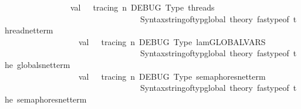 \begin{isabellebody}
\ \ \ \ \ \ \ \ \ \ \ \ \ {\isacharparenleft}{\kern0pt}{\isacharasterisk}{\kern0pt}\ \ \ val\ {\isacharunderscore}{\kern0pt}\ {\isacharequal}{\kern0pt}\ tracing\ {\isacharparenleft}{\kern0pt}{\isachardoublequote}{\kern0pt}{\isacharbackslash}{\kern0pt}n\ {\isacharbrackleft}{\kern0pt}DEBUG{\isacharbrackright}{\kern0pt}\ Type\ threads\ {\isacharequal}{\kern0pt}\ {\isachardoublequote}{\kern0pt}\ {\isacharcircum}{\kern0pt}\isanewline
\ \ \ \ \ \ \ \ \ \ \ \ \ \ \ \ \ \ \ \ \ \ \ \ \ \ \ \ \ \ \ \ \ Syntax{\isachardot}{\kern0pt}string{\isacharunderscore}{\kern0pt}of{\isacharunderscore}{\kern0pt}typ{\isacharunderscore}{\kern0pt}global\ {\isacharat}{\kern0pt}{\isacharbraceleft}{\kern0pt}theory{\isacharbraceright}{\kern0pt}\ {\isacharparenleft}{\kern0pt}fastype{\isacharunderscore}{\kern0pt}of\ {\isacharparenleft}{\kern0pt}thread{\isacharunderscore}{\kern0pt}net{\isacharunderscore}{\kern0pt}term{\isacharparenright}{\kern0pt}\ {\isacharparenright}{\kern0pt}{\isacharparenright}{\kern0pt}\isanewline
\ \ \ \ \ \ \ \ \ \ \ \ \ \ \ \ \ \ val\ {\isacharunderscore}{\kern0pt}\ {\isacharequal}{\kern0pt}\ tracing\ {\isacharparenleft}{\kern0pt}{\isachardoublequote}{\kern0pt}{\isacharbackslash}{\kern0pt}n\ {\isacharbrackleft}{\kern0pt}DEBUG{\isacharbrackright}{\kern0pt}\ Type\ lam{\isacharunderscore}{\kern0pt}GLOBALVARS\ {\isacharequal}{\kern0pt}\ {\isachardoublequote}{\kern0pt}\ {\isacharcircum}{\kern0pt}\isanewline
\ \ \ \ \ \ \ \ \ \ \ \ \ \ \ \ \ \ \ \ \ \ \ \ \ \ \ \ \ \ \ \ \ Syntax{\isachardot}{\kern0pt}string{\isacharunderscore}{\kern0pt}of{\isacharunderscore}{\kern0pt}typ{\isacharunderscore}{\kern0pt}global\ {\isacharat}{\kern0pt}{\isacharbraceleft}{\kern0pt}theory{\isacharbraceright}{\kern0pt}\ {\isacharparenleft}{\kern0pt}fastype{\isacharunderscore}{\kern0pt}of\ {\isacharparenleft}{\kern0pt}the\ globals{\isacharunderscore}{\kern0pt}net{\isacharunderscore}{\kern0pt}term{\isacharparenright}{\kern0pt}\ {\isacharparenright}{\kern0pt}{\isacharparenright}{\kern0pt}\ \isanewline
\ \ \ \ \ \ \ \ \ \ \ \ \ \ \ \ \ \ val\ {\isacharunderscore}{\kern0pt}\ {\isacharequal}{\kern0pt}\ tracing\ {\isacharparenleft}{\kern0pt}{\isachardoublequote}{\kern0pt}{\isacharbackslash}{\kern0pt}n\ {\isacharbrackleft}{\kern0pt}DEBUG{\isacharbrackright}{\kern0pt}\ Type\ semaphores{\isacharunderscore}{\kern0pt}net{\isacharunderscore}{\kern0pt}term\ {\isacharequal}{\kern0pt}\ {\isachardoublequote}{\kern0pt}\ {\isacharcircum}{\kern0pt}\isanewline
\ \ \ \ \ \ \ \ \ \ \ \ \ \ \ \ \ \ \ \ \ \ \ \ \ \ \ \ \ \ \ \ \ Syntax{\isachardot}{\kern0pt}string{\isacharunderscore}{\kern0pt}of{\isacharunderscore}{\kern0pt}typ{\isacharunderscore}{\kern0pt}global\ {\isacharat}{\kern0pt}{\isacharbraceleft}{\kern0pt}theory{\isacharbraceright}{\kern0pt}\ {\isacharparenleft}{\kern0pt}fastype{\isacharunderscore}{\kern0pt}of\ {\isacharparenleft}{\kern0pt}the\ semaphores{\isacharunderscore}{\kern0pt}net{\isacharunderscore}{\kern0pt}term{\isacharparenright}{\kern0pt}\ {\isacharparenright}{\kern0pt}{\isacharparenright}{\kern0pt}\ \ \ \ \ \isanewline

\end{isabellebody}
